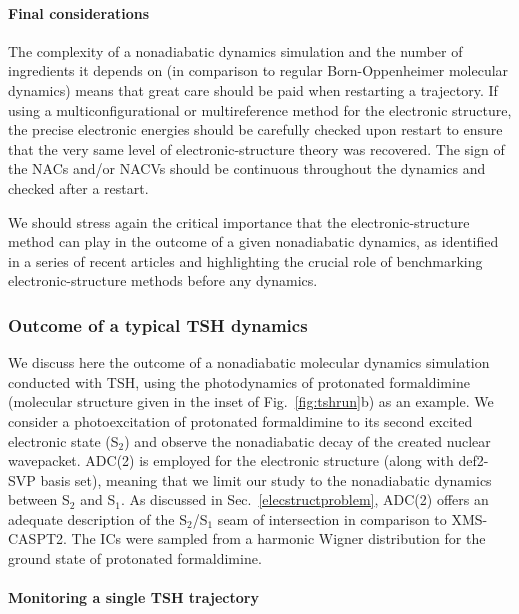 \documentclass[9pt,bestpractices]{livecoms}
\begin{document}
\paragraph{Final considerations}

The complexity of a nonadiabatic dynamics simulation and the number of ingredients it depends on (in comparison to regular Born-Oppenheimer molecular dynamics) means that great care should be paid when restarting a trajectory. If using a multiconfigurational or multireference method for the electronic structure, the precise electronic energies should be carefully checked upon restart to ensure that the very same level of electronic-structure theory was recovered. The sign of the NACs and/or NACVs should be continuous throughout the dynamics and checked after a restart.

We should stress again the critical importance that the electronic-structure method can play in the outcome of a given nonadiabatic dynamics, as identified in a series of recent articles and highlighting the crucial role of benchmarking electronic-structure methods before any dynamics.\cite{janos2023controls,papineau2024,tomas2024}

\subsubsection{Outcome of a typical TSH dynamics}
\label{sec:tshoutcome}

We discuss here the outcome of a nonadiabatic molecular dynamics simulation conducted with TSH, using the photodynamics of protonated formaldimine (molecular structure given in the inset of Fig.~\ref{fig:tshrun}b) as an example. We consider a photoexcitation of protonated formaldimine to its second excited electronic state (S$_2$) and observe the nonadiabatic decay of the created nuclear wavepacket. ADC(2) is employed for the electronic structure (along with def2-SVP basis set), meaning that we limit our study to the nonadiabatic dynamics between S$_2$ and S$_1$. As discussed in Sec.~\ref{elecstructproblem}, ADC(2) offers an adequate description of the S$_2$/S$_1$ seam of intersection in comparison to XMS-CASPT2. The ICs were sampled from a harmonic Wigner distribution for the ground state of protonated formaldimine. 

\paragraph{Monitoring a single TSH trajectory}
\end{document}
